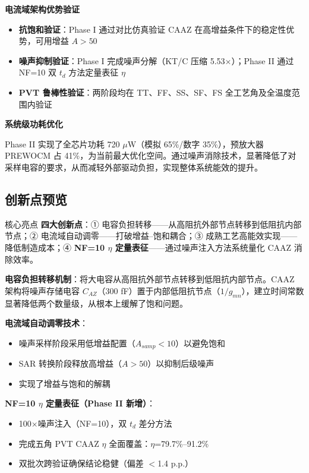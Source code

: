\documentclass[11pt,a4paper,UTF8]{ctexart}
\begin{document}
\textbf{电流域架构优势验证}
\begin{itemize}
  \item \textbf{抗饱和验证}：Phase I 通过对比仿真验证 CAAZ 在高增益条件下的稳定性优势，可用增益 $A > 50$
  \item \textbf{噪声抑制验证}：Phase I 完成噪声分解（KT/C 压缩 5.53$\times$）；Phase II 通过 NF=10 双 $t_d$ 方法定量表征 $\eta$
  \item \textbf{PVT 鲁棒性验证}：两阶段均在 TT、FF、SS、SF、FS 全工艺角及全温度范围内验证
\end{itemize}

\textbf{系统级功耗优化}

Phase II 实现了全芯片功耗 720 $\mu$W（模拟 65\%/数字 35\%），预放大器 PREWOCM 占 41\%，为当前最大优化空间。通过噪声消除技术，显著降低了对采样电容的要求，从而减轻外部驱动负担，实现整体系统能效的提升。

\subsection{创新点预览}

\begin{findbox}{核心亮点}
\textbf{四大创新点}：① 电容负担转移——从高阻抗外部节点转移到低阻抗内部节点；② 电流域自动调零——打破增益--饱和耦合；③ 成熟工艺高能效实现——降低制造成本；④ \textbf{NF=10 $\eta$ 定量表征}——通过噪声注入方法系统量化 CAAZ 消除效率。
\end{findbox}

\textbf{电容负担转移机制}：将大电容从高阻抗外部节点转移到低阻抗内部节点。CAAZ 架构将噪声存储电容 $C_{AZ}$（300 fF）置于内部低阻抗节点（$1/g_{mn}$），建立时间常数显著降低两个数量级，从根本上缓解了饱和问题。

\textbf{电流域自动调零技术}：
\begin{itemize}
  \item 噪声采样阶段采用低增益配置（$A_{samp} < 10$）以避免饱和
  \item SAR 转换阶段释放高增益（$A > 50$）以抑制后级噪声
  \item 实现了增益与饱和的解耦
\end{itemize}

\textbf{NF=10 $\eta$ 定量表征（Phase II 新增）}：
\begin{itemize}
  \item 100$\times$噪声注入（NF=10），双 $t_d$ 差分方法
  \item 完成五角 PVT CAAZ $\eta$ 全面覆盖：$\eta$=79.7\%--91.2\%
  \item 双批次跨验证确保结论稳健（偏差 $<$1.4 p.p.）
\end{itemize}
\end{document}
